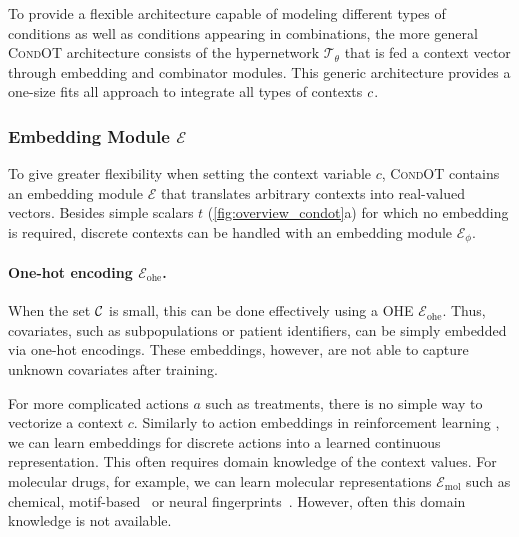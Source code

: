 To provide a flexible architecture capable of modeling different types of conditions as well as conditions appearing in combinations, the more general \textsc{CondOT} architecture consists of the hypernetwork $\mathcal{T}_\theta$ that is fed a context vector through embedding and combinator modules. This generic architecture provides a one-size fits all approach to integrate all types of contexts $c$.

\subsubsection{Embedding Module $\mathcal{E}$}
 To give greater flexibility when setting the context variable $c$, \textsc{CondOT} contains an embedding module $\mathcal{E}$ that translates arbitrary contexts into real-valued vectors. Besides simple scalars $t$ (\cref{fig:overview_condot}a) for which no embedding is required, discrete contexts can be handled with an embedding module $\mathcal{E}_\phi$.

\paragraph{One-hot encoding $\mathcal{E}_\text{ohe}$.}
When the set ${\mathcal{C}}$ is small, this can be done effectively using a \acrfull{OHE} $\mathcal{E}_\text{ohe}$.
Thus, covariates, such as subpopulations or patient identifiers, can be simply embedded via one-hot encodings. These embeddings, however, are not able to capture unknown covariates after training.

For more complicated actions $a$ such as treatments, there is no simple way to vectorize a context $c$. Similarly to action embeddings in reinforcement learning \citep{chandak2019learning, tennenholtz2019natural}, we can learn embeddings for discrete actions into a learned continuous representation.
This often requires domain knowledge of the context values. For molecular drugs, for example, we can learn molecular representations $\mathcal{E}_\text{mol}$ such as chemical, motif-based~\citep{rogers2010extended} or neural fingerprints~\citep{rong2020grover, schwaller2022machine, rogers2010extended}.
However, often this domain knowledge is not available. 

